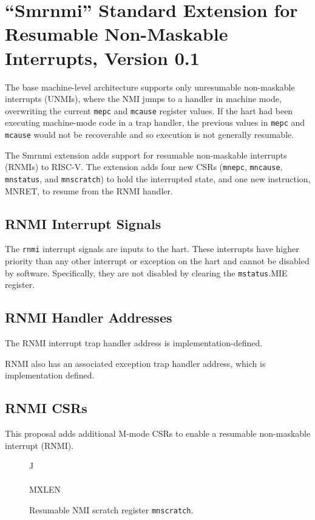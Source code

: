 \chapter{``Smrnmi'' Standard Extension for Resumable Non-Maskable Interrupts, Version 0.1}
\label{chap:rnmi}

The base machine-level architecture supports only
unresumable non-maskable interrupts (UNMIs), where the NMI jumps to a
handler in machine mode, overwriting the current {\tt mepc} and {\tt mcause}
register values.  If the hart had been executing machine-mode code in
a trap handler, the previous values in {\tt mepc} and {\tt mcause} would not
be recoverable and so execution is not generally resumable.

The Smrnmi extension adds support for resumable non-maskable interrupts
(RNMIs) to RISC-V.  The extension adds four new CSRs ({\tt mnepc},
{\tt mncause}, {\tt mnstatus}, and {\tt mnscratch}) to hold the interrupted state,
and one new instruction, MNRET, to resume from the RNMI handler.

\section{RNMI Interrupt Signals}

The {\tt rnmi} interrupt signals are inputs to
the hart.  These interrupts have higher priority than any other
interrupt or exception on the hart and cannot be disabled by software.
Specifically, they are not disabled by clearing the {\tt mstatus}.MIE
register.

\section{RNMI Handler Addresses}

The RNMI interrupt trap handler address is implementation-defined.

RNMI also has an associated exception trap handler address, which is
implementation defined.

\section{RNMI CSRs}

This proposal adds additional M-mode CSRs to enable a resumable
non-maskable interrupt (RNMI).

\begin{figure*}[h!]
{\footnotesize
\begin{center}
\setlength{\tabcolsep}{4pt}
\begin{tabular}{J}
 \\
\hline
{} \\
\hline
MXLEN \\
\end{tabular}
\end{center}
}
\vspace{-0.1in}
\caption{Resumable NMI scratch register {\tt mnscratch}.}
\label{fig:mnscratch}
\end{figure*}

